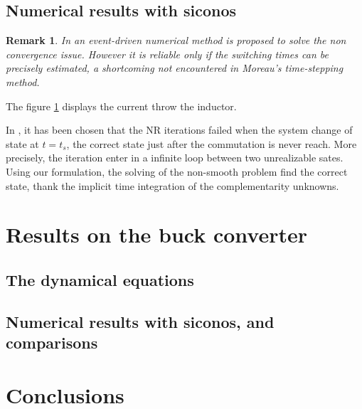 \documentclass{article}
\newtheorem{remark}{Remark}
\begin{document}
\subsection{Numerical results with {\sc siconos}}
\label{section32}


\begin{remark}
In \cite{maffezzoni2006} an event-driven numerical method is proposed to solve the non convergence issue. However it is reliable only if the switching times can be precisely estimated, a shortcoming not encountered  in Moreau's time-stepping method. 
\end{remark}

The figure \ref{fig:SIMU_CS} displays the current throw the inductor.

 \begin{figure}[h]
   
  \label{fig:SIMU_CS}
 \end{figure}

 In \cite{maffezzoni2006}, it has been chosen that the NR iterations failed when the system change of
 state at $t=t_s$, the correct state just after the commutation is never reach. More precisely, the
 iteration enter in a infinite loop between two unrealizable sates. \\
 Using our formulation, the solving of the non-smooth problem find the correct state, thank the
 implicit time integration of the complementarity unknowns.



 

\section{Results on the buck converter}
\label{section4}


\subsection{The dynamical equations}
\label{section41}


\subsection{Numerical results with {\sc siconos},  and comparisons}
\label{section42}



\section{Conclusions}
\label{section5}
\end{document}
